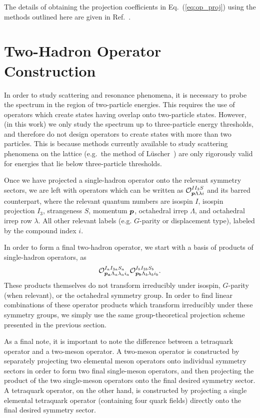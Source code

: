     The details of obtaining the projection coefficients in Eq.~(\ref{eq:op_proj}) using the methods outlined here are given in Ref.~\cite{Basak:2005aq}.
    \section{Two-Hadron Operator Construction}
    In order to study scattering and resonance phenomena, it is necessary to probe the spectrum in the region of two-particle energies. This requires the use of operators which create states having overlap onto two-particle states. However, (in this work) we only study the spectrum up to three-particle energy thresholds, and therefore do not design operators to create states with more than two particles. This is because methods currently available to study scattering phenomena on the lattice (e.g.~the method of L\"uscher~\cite{Luscher:1990ck}) are only rigorously valid for energies that lie below three-particle thresholds.

    Once we have projected a single-hadron operator onto the relevant symmetry sectors, we are left with operators which can be written as $\mathcal O_{\boldsymbol{p} \Lambda \lambda i}^{I I_3 S}$ and its barred counterpart, where the relevant quantum numbers are isospin $I$, isospin projection $I_3$, strangeness $S$, momentum $\boldsymbol{p}$, octahedral irrep $\Lambda$, and octahedral irrep row $\lambda$. All other relevant labels (e.g. $G$-parity or displacement type), labeled by the compound index $i$.
    
    In order to form a final two-hadron operator, we start with a basis of products of single-hadron operators, as
    \begin{equation}
        \mathcal O_{\boldsymbol{p_a} \Lambda_a \lambda_a i_a}^{I_a I_{3a} S_a} \mathcal O_{\boldsymbol{p_b} \Lambda_b \lambda_b i_b}^{I_b I_{3b} S_b}.
    \end{equation}
    These products themselves do not transform irreducibly under isospin, $G$-parity (when relevant), or the octahedral symmetry group. In order to find linear combinations of these operator products which transform irreducibly under these symmetry groups, we simply use the same group-theoretical projection scheme presented in the previous section.

    As a final note, it is important to note the difference between a tetraquark operator and a two-meson operator. A two-meson operator is constructed by separately projecting two elemental meson operators onto individual symmetry sectors in order to form two final single-meson operators, and then projecting the product of the two single-meson operators onto the final desired symmetry sector. A tetraquark operator, on the other hand, is constructed by projecting a single elemental tetraquark operator (containing four quark fields) directly onto the final desired symmetry sector.